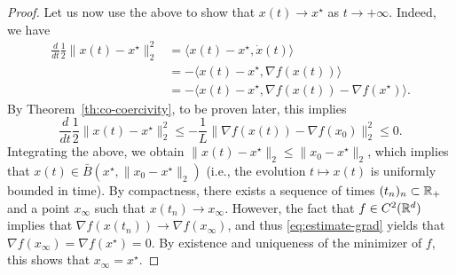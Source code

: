 \begin{proof}
         Let us now use the above to show that $x(t)\rightarrow x^\star$ as $t\to +\infty$.
         Indeed, we have
         \begin{equation}
             \begin{split}
                 \frac{d}{dt}\frac12\|x(t)-x^\star\|_2^2
                  & = \langle x(t)-x^\star, \dot x(t) \rangle                             \\
                  & = -\langle x(t)-x^\star, \nabla f( x(t)) \rangle                      \\
                  & = -\langle x(t)-x^\star, \nabla f( x(t)) - \nabla f(x^\star) \rangle.
             \end{split}
         \end{equation}
         By Theorem~\ref{th:co-coercivity}, to be proven later, this implies
         \begin{equation}
             \frac{d}{dt}\frac12\|x(t)-x^\star\|_2^2
             \le -\frac{1}{L} \|\nabla f(x(t))-\nabla f(x_0)\|_2^2
             \le 0.
         \end{equation}
         Integrating the above, we obtain $\|x(t)-x^\star\|_2 \le \|x_0-x^\star\|_2$, which implies that $x(t)\in \bar B(x^\star, \|x_0-x^\star\|_2)$ (i.e., the evolution $t\mapsto x(t)$ is uniformly bounded in time).
         By compactness, there exists a sequence of times $(t_n)_n\subset \mathbb{R}_+$ and a point $x_\infty$ such that $x(t_n)\rightarrow x_\infty$.
         However, the fact that $f\in C^2(\mathbb{R}^d)$ implies that $\nabla f(x(t_n))\rightarrow \nabla f(x_\infty)$, and thus  \eqref{eq:estimate-grad} yields that $\nabla f(x_\infty) = \nabla f(x^\star)=0$.
         By existence and uniqueness of the minimizer of $f$, this shows that $x_\infty=x^\star$.
     \end{proof}
 
